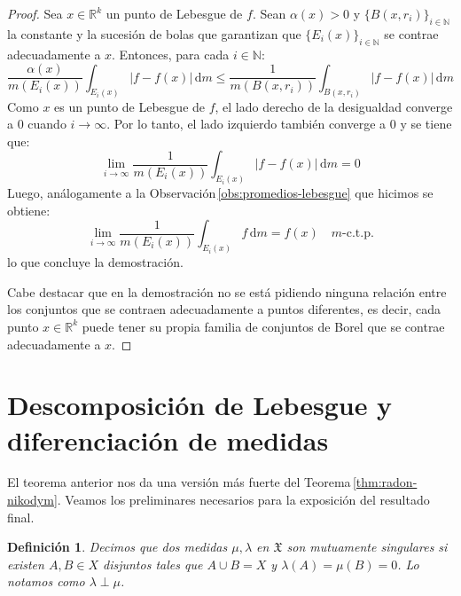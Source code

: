 \documentclass[12pt,a4paper]{article}
\theoremstyle{profesional}
\theoremstyle{definicion-style}
\newtheorem{definicion}{Definición}[section]
\newcommand{\R}{\mathbb{R}}
\newcommand{\N}{\mathbb{N}}
\newcommand{\X}{\mathfrak{X}}
\begin{document}
\begin{proof}
    Sea \( x \in \R^k \) un punto de Lebesgue de \( f \). Sean \( \alpha(x) > 0 \) y \( {\{ B(x, r_i) \}}_{i \in \N} \) la constante y la sucesión de bolas que garantizan que \( {\{ E_i(x) \}}_{i \in \N} \) se contrae adecuadamente a \( x \). Entonces, para cada \( i \in \N \):
    \[
        \frac{\alpha(x)}{m(E_i(x))} \int_{E_i(x)} |f - f(x)| \, \mathrm{d} m \leq \frac{1}{m(B(x, r_i))} \int_{B(x, r_i)} |f - f(x)| \, \mathrm{d} m
    \]
    Como \( x \) es un punto de Lebesgue de \( f \), el lado derecho de la desigualdad converge a \( 0 \) cuando \( i \to \infty \). Por lo tanto, el lado izquierdo también converge a \( 0 \) y se tiene que:
    \[
        \lim_{i \to \infty} \frac{1}{m(E_i(x))} \int_{E_i(x)} |f - f(x)| \, \mathrm{d} m = 0
    \]
    Luego, análogamente a la Observación\( \, \)\ref{obs:promedios-lebesgue} que hicimos se obtiene:
    \[
        \lim_{i \to \infty} \frac{1}{m(E_i(x))} \int_{E_i(x)} f \, \mathrm{d} m = f(x) \quad m\text{-c.t.p.}
    \]
    lo que concluye la demostración.

    Cabe destacar que en la demostración no se está pidiendo ninguna relación entre los conjuntos que se contraen adecuadamente a puntos diferentes, es decir, cada punto \( x \in \R^k \) puede tener su propia familia de conjuntos de Borel que se contrae adecuadamente a \( x \).
\end{proof}

\newpage
\section{Descomposición de Lebesgue y diferenciación de medidas}

El teorema anterior nos da una versión más fuerte del Teorema\( \, \)\ref{thm:radon-nikodym}. Veamos los preliminares necesarios para la exposición del resultado final.

\begin{definicion}
    Decimos que dos medidas \( \mu, \lambda \) en \( \X \) son mutuamente singulares si existen \( A, B \in X \) disjuntos tales que \( A \cup B = X \) y \( \lambda(A) = \mu(B) = 0 \).
    Lo notamos como \( \lambda \perp \mu \).
\end{definicion}
\end{document}
